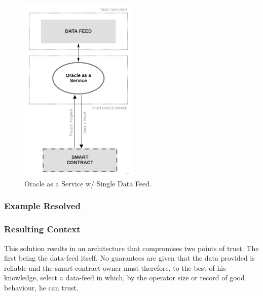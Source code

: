 \begin{figure}[t]
  \begin{center}
    \leavevmode
    \includegraphics[width=0.5\textwidth]{figures/oraclearch1.jpg}
    \caption{Oracle as a Service w/ Single Data Feed.}
    \label{fig:/figures/paper-screening}
  \end{center}
\end{figure}

\subsubsection{Example Resolved}


\subsubsection{Resulting Context}
This solution results in an architecture that compromises two points of trust. The first being the data-feed itself. No guarantees are given that the data provided is reliable and the smart contract owner must therefore, to the best of his knowledge, select a data-feed in which, by the operator size or record of good behaviour, he can trust.

